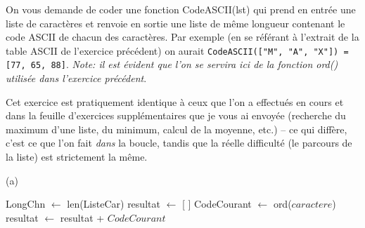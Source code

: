 \documentclass[11pt,a4paper]{exam}
\begin{document}
\begin{questions}
\begin{spacing}{1}
\begin{solution}
			\end{solution} 
			
		
			On vous demande de coder une fonction CodeASCII(lst) qui prend en entrée une liste de caractères et renvoie en sortie une liste de même longueur contenant le code ASCII de chacun des caractères. Par exemple (en se référant à l'extrait de la table ASCII de l'exercice précédent) on aurait \texttt{CodeASCII(["M", "A", "X"]) = [77, 65, 88]}. \textit{Note: il est évident que l'on se servira ici de la fonction ord() utilisée dans l'exercice précédent}\footnotemark[2].
			
			
			\begin{solution}
				Cet exercice est pratiquement identique à ceux que l'on a effectués en cours et dans la feuille d'exercices supplémentaires que je vous ai envoyée (recherche du maximum d'une liste, du minimum, calcul de la moyenne, etc.) -- ce qui diffère, c'est ce que l'on fait \textit{dans} la boucle, tandis que la réelle difficulté (le parcours de la liste) est strictement la même.
				
				(a)
				\begin{algorithmic}[1]
					\State LongChn $\leftarrow$ len(ListeCar)
					\State resultat $\leftarrow$ [ ]
					\State CodeCourant $\leftarrow$ ord($caractere$)
					\State resultat $\leftarrow$ resultat + $CodeCourant$
					\EndFor
					\State{}
					\EndFunction
				\end{algorithmic}
				

\end{solution}
\end{spacing}
\end{questions}
\end{document}
